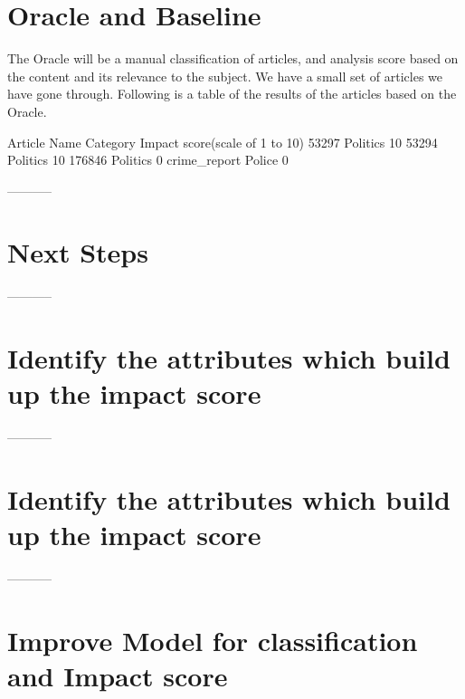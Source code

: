 \documentclass{article}
\begin{document}

\section*{Oracle and Baseline} %

The Oracle will be a manual classification of articles, and analysis score based on the content and its relevance to the subject.
We have a small set of articles we have gone through.
Following is a table of the results of the articles based on the Oracle.

Article Name    Category    Impact score(scale of 1 to 10)
53297           Politics    10
53294           Politics    10
176846          Politics    0
crime_report    Police      0




-----------

\section*{Next Steps} %


-----------

\section*{Identify the attributes which build up the impact score} %


-----------

\section*{Identify the attributes which build up the impact score} %



-----------

\section*{Improve Model for classification and Impact score} %
\end{document}

